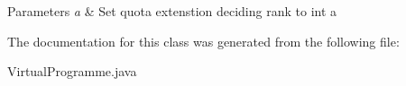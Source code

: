 \begin{DoxyParams}{Parameters}
{\em a} & Set quota extenstion deciding rank to int a \\
\hline
\end{DoxyParams}


The documentation for this class was generated from the following file\+:\begin{DoxyCompactItemize}
\item 
Virtual\+Programme.\+java\end{DoxyCompactItemize}
